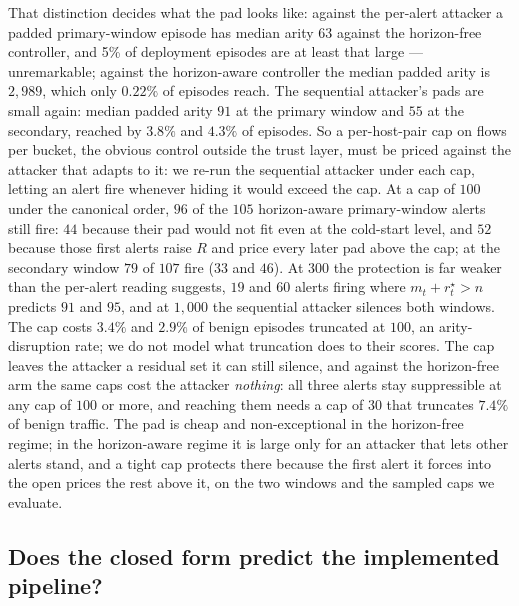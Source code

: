 \documentclass[conference]{IEEEtran}
\begin{document}
That distinction decides what the pad looks like: against the per-alert attacker a padded
primary-window episode has median arity 63 against the horizon-free controller, and 5\% of deployment
episodes are at least that large --- unremarkable; against the horizon-aware controller the median
padded arity is $2{,}989$, which only $0.22\%$ of episodes reach. The sequential attacker's pads are
small again: median padded arity $91$ at the primary window and $55$ at the secondary, reached by
$3.8\%$ and $4.3\%$ of episodes. So a per-host-pair cap on flows per bucket, the obvious control outside the trust layer, must be
priced against the attacker that adapts to it: we re-run the sequential attacker under each cap,
letting an alert fire whenever hiding it would exceed the cap. At
a cap of $100$ under the canonical order, $96$ of the $105$ horizon-aware primary-window alerts still
fire: $44$ because their pad would not fit even at the cold-start level, and $52$ because those first
alerts raise $R$ and price every later pad above the cap; at the secondary window $79$ of $107$ fire
($33$ and $46$). At $300$ the protection is far weaker than the per-alert reading suggests, $19$ and
$60$ alerts firing where $m_t+r^{\star}_t>n$ predicts $91$ and $95$, and at $1{,}000$ the sequential
attacker silences both windows. The cap costs $3.4\%$ and $2.9\%$ of benign episodes truncated at
$100$, an arity-disruption rate; we do not model what truncation does to their scores. The cap leaves
the attacker a residual set it can still silence, and against the horizon-free arm the same caps cost
the attacker \emph{nothing}: all three alerts stay suppressible at any cap of $100$ or more, and reaching them needs a cap of $30$ that
truncates $7.4\%$ of benign traffic. The pad is cheap and non-exceptional in the horizon-free regime; in
the horizon-aware regime it is large only for an attacker that lets other alerts stand, and a tight cap
protects there because the first alert it forces into the open prices the rest above it, on the two
windows and the sampled caps we evaluate.


\subsection{Does the closed form predict the implemented pipeline?}\label{sec:replay}
\end{document}
